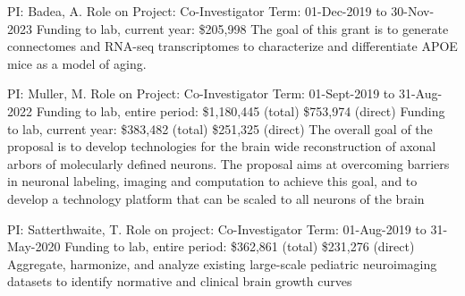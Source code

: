 \documentclass[10pt,colorlinks=true,urlcolor=blue]{moderncv}
\begin{document}
    {\newline PI: Badea, A.
    \newline Role on Project: Co-Investigator
    \newline Term: 01-Dec-2019 to 30-Nov-2023
    \newline Funding to lab, current year: \$205,998
    \newline The goal of this grant is to generate connectomes and RNA-seq transcriptomes to characterize and differentiate APOE mice as a model of aging.
    }{}{}{}
    
    
    
    {\newline PI: Muller, M.
    \newline Role on Project: Co-Investigator
    \newline Term: 01-Sept-2019 to 31-Aug-2022
    \newline Funding to lab, entire period: \$1,180,445 (total) \$753,974 (direct) 
    \newline Funding to lab, current year: \$383,482 (total) \$251,325 (direct)
    \newline The overall goal of the proposal is to develop technologies for the brain wide reconstruction
    of axonal arbors of molecularly defined neurons. The proposal aims at overcoming barriers
    in neuronal labeling, imaging and computation to achieve this goal, and to develop a
    technology platform that can be scaled to all neurons of the brain}{}{}{}
    
    {\newline PI: Satterthwaite, T.
    \newline Role on project: Co-Investigator
    \newline Term: 01-Aug-2019 to 31-May-2020
    \newline Funding to lab, entire period: \$362,861 (total) \$231,276 (direct)
    \newline Aggregate, harmonize, and analyze existing large-scale pediatric neuroimaging datasets to
    identify normative and clinical brain growth curves}{}{}{}
    
\end{document}
